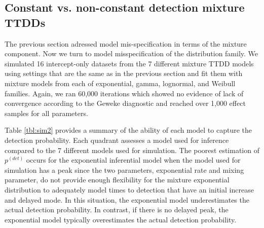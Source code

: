 \documentclass[useAMS,usenatbib,referee,12pt]{article}
\newcommand{\pdet}{p^{(det)}}
\begin{document}







\subsection{Constant vs. non-constant detection mixture TTDDs}\label{sec:family}

The previous section adressed model mis-specification in terms of the mixture component. 
Now we turn to model misspecification of the distribution family. 
We simulated 16 intercept-only datasets from the 7 different mixture TTDD models using settings that are the same as in the previous section and fit them with mixture models from each of exponential, gamma, lognormal, and Weibull families.
Again, we ran 60,000 iterations which showed no evidence of lack of convergence according to the Geweke diagnostic and reached over 1,000 effect samples for all parameters.

Table \ref{tbl:sim2} provides a summary of the ability of each model to capture the detection probability. 
Each quadrant assesses a model used for inference compared to the 7 different models used for simulation. 
The poorest estimation of $\pdet$ occurs for the exponential inferential model when the model used for simulation has a peak since the two parameters, exponential rate and mixing parameter, do not provide enough flexibility for the mixture exponential distribution to adequately model times to detection that have an initial increase and delayed mode. 
In this situation, the exponential model underestimates the actual detection probability.
In contrast, if there is no delayed peak, the exponential model typically overestimates the actual detection probability. 
\end{document}
